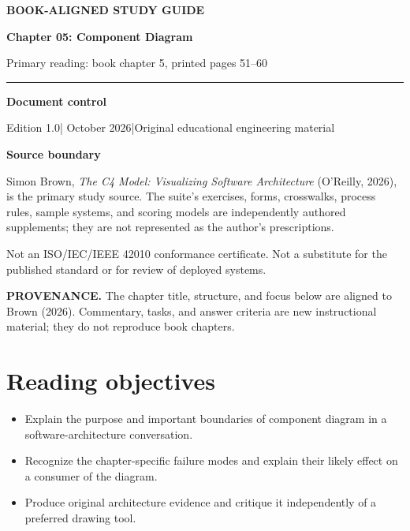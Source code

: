 \documentclass[10pt,letterpaper]{article}
\newcommand{\SourceNote}[1]{\par\smallskip\noindent\colorbox{C4Light}{\parbox{0.94\linewidth}{\footnotesize\textbf{PROVENANCE.} #1}}\par\medskip}
\newcommand{\DocStart}[3]{%
\begin{document}
\begin{titlepage}
\renewcommand{\thepage}{title-\arabic{page}}
\vspace*{0.55in}
{\sffamily\bfseries\small\color{C4Teal}#1}\par\vspace{0.24in}
{\sffamily\bfseries\fontsize{26}{31}\selectfont\color{C4Navy}#2}\par\vspace{0.18in}
{\large\color{C4Gray}#3}\par\vspace{0.4in}
\textcolor{C4Teal}{\rule{\linewidth}{1.15pt}}\par\vspace{0.24in}
\textbf{Document control}\par
Edition 1.0\quad|\quad 30 October 2026\quad|\quad Original educational engineering material\par
\vspace{0.17in}
\textbf{Source boundary}\par
Simon Brown, \emph{The C4 Model: Visualizing Software Architecture} (O'Reilly, 2026), is the primary study source. The suite's exercises, forms, crosswalks, process rules, sample systems, and scoring models are independently authored supplements; they are not represented as the author's prescriptions.\par
\vfill
{\small\color{C4Gray}Not an ISO/IEC/IEEE 42010 conformance certificate. Not a substitute for the published standard or for review of deployed systems.}\par
\end{titlepage}
}
\DocStart{BOOK-ALIGNED STUDY GUIDE}{Chapter 05: Component Diagram}{Primary reading: book chapter 5, printed pages 51–60}
\SourceNote{The chapter title, structure, and focus below are aligned to Brown (2026). Commentary, tasks, and answer criteria are new instructional material; they do not reproduce book chapters.}
\section{Reading objectives}
\begin{itemize}
\item Explain the purpose and important boundaries of component diagram in a software-architecture conversation.
\item Recognize the chapter-specific failure modes and explain their likely effect on a consumer of the diagram.
\item Produce original architecture evidence and critique it independently of a preferred drawing tool.
\end{itemize}
\end{document}

